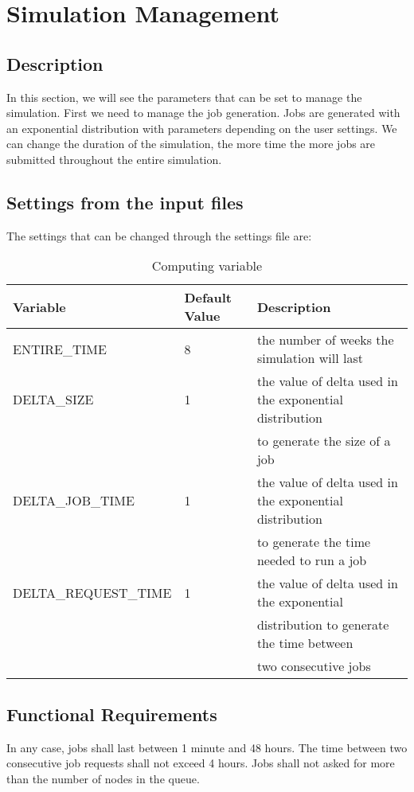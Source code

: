 \documentclass{scrreprt}
\begin{document}
\section{Simulation Management}

\subsection{Description}
In this section, we will see the parameters that can be set to manage the simulation. First we need to manage the job generation. Jobs are generated with an exponential distribution with parameters depending on the user settings. We can change the duration of the simulation, the more time the more jobs are submitted throughout the entire simulation.
\subsection{Settings from the input files}
The settings that can be changed through the settings file are:

\begin{table}[ht]
\centering
\caption{Computing variable}
\begin {tabular}{ l l l }
\toprule
Variable & Default Value & Description \\
\midrule
\midrule
ENTIRE_TIME & 8 & the number of weeks the simulation will last \\
DELTA_SIZE & 1 & the value of delta used in the exponential distribution \\&& to generate the size of a job\\
DELTA_JOB_TIME & 1 & the value of delta used in the exponential distribution\\&& to generate the time needed to run a job\\
DELTA_REQUEST_TIME & 1 & the value of delta used in the exponential \\&& distribution to generate the time between \\&& two consecutive jobs\\ 

\bottomrule
\end {tabular}
\end{table}


\subsection{Functional Requirements}
In any case, jobs shall last between 1 minute and 48 hours. The time between two consecutive job requests shall not exceed 4 hours. Jobs shall not asked for more than the number of nodes in the queue.
\end{document}
